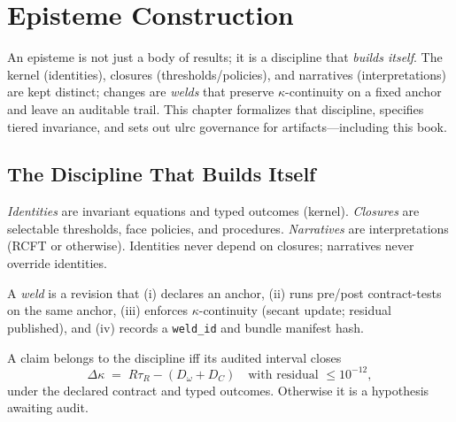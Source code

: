 \chapter{Episteme Construction}
\label{ch:episteme}

An episteme is not just a body of results; it is a discipline that \emph{builds itself}. The kernel (identities), closures (thresholds/policies), and narratives (interpretations) are kept distinct; changes are \emph{welds} that preserve \(\kappa\)-continuity on a fixed anchor and leave an auditable trail. This chapter formalizes that discipline, specifies tiered invariance, and sets out \gls{ulrc} governance for artifacts—including this book.

\section{The Discipline That Builds Itself}
\label{sec:discipline}

\begin{definition}
\emph{Identities} are invariant equations and typed outcomes (kernel). \emph{Closures} are selectable thresholds, face policies, and procedures. \emph{Narratives} are interpretations (RCFT or otherwise). Identities never depend on closures; narratives never override identities.
\end{definition}

\begin{definition}[Governed change = weld]
A \emph{weld} is a revision that (i) declares an anchor, (ii) runs pre/post contract-tests on the same anchor, (iii) enforces \(\kappa\)-continuity (secant update; residual published), and (iv) records a \texttt{weld\_id} and bundle manifest hash.
\end{definition}

\begin{proposition}
A claim belongs to the discipline iff its audited interval closes
\[
\Delta\kappa \;=\; R\tau_{R} - (D_{\omega}+D_{C})
\quad\text{with residual }\le 10^{-12},
\]
under the declared contract and typed outcomes. Otherwise it is a hypothesis awaiting audit.
\end{proposition}

